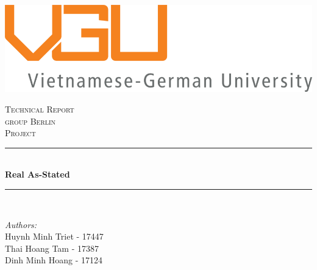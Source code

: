\begin{titlepage}

\newcommand{\HRule}{\rule{\linewidth}{0.5mm}} %

\centering
\includegraphics{./title/Logo20.png}


 

\center %


\textsc{\LARGE Technical Report}\\[1.5cm] 
\textsc{\Large group Berlin}\\[0.5cm] 
\textsc{\large Project}\\[0.5cm] 

\makeatletter
\HRule \\[0.4cm]
{ \huge \bfseries Real As-Stated }\\[0.4cm] %
\HRule \\[1.5cm]
 

\begin{minipage}{0.5\textwidth}
\begin{flushleft} \large
\emph{Authors:}\\
Huynh Minh Triet - 17447\\
Thai Hoang Tam   -  17387\\
Dinh Minh Hoang  - 17124\\



\end{flushleft}
\end{minipage}
\end{titlepage}
